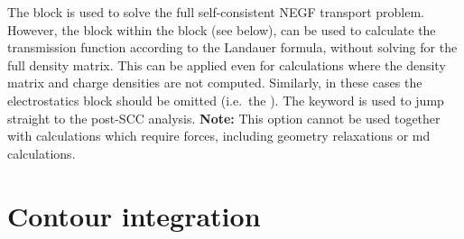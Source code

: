The  block is used to solve the full self-consistent NEGF
transport problem. However, the block  within the
 block (see below), can be used to calculate the transmission
function according to the Landauer formula, without solving for the full density
matrix. This can be applied even for calculations where the density matrix and
charge densities are not computed. Similarly, in these cases the electrostatics
block should be omitted (i.e.\ the ). The keyword
 is used to jump straight to the post-SCC
analysis.  \textbf{Note:} This option cannot be used together with calculations
which require forces, including geometry relaxations or md calculations.


\section{Contour integration}
\label{sec:transport.contourint}


